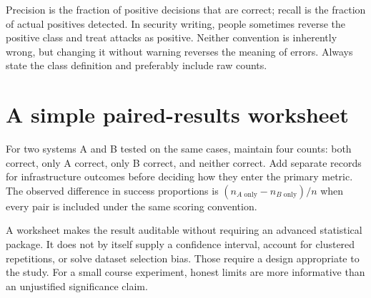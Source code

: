 Precision is the fraction of positive decisions that are correct; recall is the fraction of actual positives detected. In security writing, people sometimes reverse the positive class and treat attacks as positive. Neither convention is inherently wrong, but changing it without warning reverses the meaning of errors. Always state the class definition and preferably include raw counts.

\section{A simple paired-results worksheet}
For two systems A and B tested on the same cases, maintain four counts: both correct, only A correct, only B correct, and neither correct. Add separate records for infrastructure outcomes before deciding how they enter the primary metric. The observed difference in success proportions is \((n_{A\text{ only}}-n_{B\text{ only}})/n\) when every pair is included under the same scoring convention.

A worksheet makes the result auditable without requiring an advanced statistical package. It does not by itself supply a confidence interval, account for clustered repetitions, or solve dataset selection bias. Those require a design appropriate to the study. For a small course experiment, honest limits are more informative than an unjustified significance claim.

